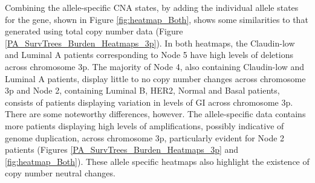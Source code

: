 Combining the allele-specific CNA states, by adding the individual allele states for the gene, shown in Figure \ref{fig:heatmap_Both}, shows some similarities to that generated using total copy number data (Figure \ref{PA_SurvTrees_Burden_Heatmaps_3p}). In both heatmaps, the Claudin-low and Luminal A patients corresponding to Node 5 have high levels of deletions across chromosome 3p. The majority of Node 4, also containing Claudin-low and Luminal A patients, display little to no copy number changes across chromosome 3p and Node 2, containing Luminal B, HER2, Normal and Basal patients, consists of patients displaying variation in levels of GI across chromosome 3p. There are some noteworthy differences, however. The allele-specific data contains more patients displaying high levels of amplifications, possibly indicative of genome duplication, across chromosome 3p, particularly evident for Node 2 patients (Figures \ref{PA_SurvTrees_Burden_Heatmaps_3p} and \ref{fig:heatmap_Both}). These allele specific heatmaps also highlight the existence of copy number neutral changes. 

